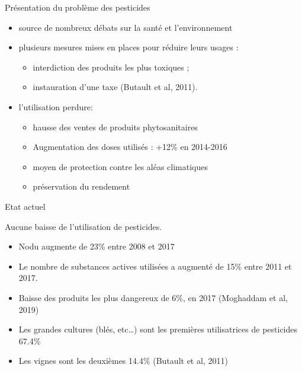 \documentclass[11pt,ignorenonframetext,]{beamer}
\providecommand{\tightlist}{%
  \setlength{\itemsep}{0pt}\setlength{\parskip}{0pt}}
\begin{document}
\begin{frame}{Présentation du problème des pesticides}
\protect\hypertarget{presentation-du-probleme-des-pesticides}{}

\begin{itemize}
\tightlist
\item
  source de nombreux débats sur la santé et l'environnement
\item
  plusieurs mesures mises en places pour réduire leurs usages :

  \begin{itemize}
  \tightlist
  \item
    interdiction des produits les plus toxiques ;
  \item
    instauration d'une taxe (Butault et al, 2011).
  \end{itemize}
\item
  l'utilisation perdure:

  \begin{itemize}
  \tightlist
  \item
    hausse des ventes de produits phytosanitaires
  \item
    Augmentation des doses utilisés : +12\% en 2014-2016
  \item
    moyen de protection contre les aléas climatiques
  \item
    préservation du rendement
  \end{itemize}
\end{itemize}

\end{frame}

\begin{frame}{Etat actuel}
\protect\hypertarget{etat-actuel}{}

Aucune baisse de l'utilisation de pesticides.

\begin{itemize}
\tightlist
\item
  Nodu augmente de 23\% entre 2008 et 2017
\item
  Le nombre de substances actives utilisées a augmenté de 15\% entre
  2011 et 2017.
\item
  Baisse des produits les plus dangereux de 6\%, en 2017 (Moghaddam et
  al, 2019)
\item
  Les grandes cultures (blés, etc\ldots{}) sont les premières
  utilisatrices de pesticides 67.4\%
\item
  Les vignes sont les deuxièmes 14.4\% (Butault et al, 2011)
\end{itemize}

\end{frame}
\end{document}
